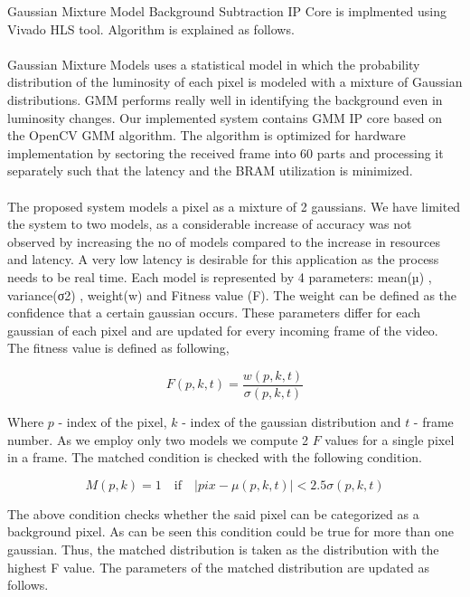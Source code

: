 \documentclass[12pt,a4paper]{report}
\begin{document}
Gaussian Mixture Model Background Subtraction IP Core is implmented using Vivado HLS tool. Algorithm is explained as follows.\\\\
Gaussian Mixture Models uses a statistical model in which the probability distribution of the luminosity of each pixel is modeled with a mixture of Gaussian distributions. GMM performs really well in identifying the background even in luminosity changes. Our implemented system contains GMM IP core based on the OpenCV GMM algorithm.  The algorithm is optimized for hardware implementation by sectoring the received frame into 60 parts and processing it separately such that the latency and the BRAM utilization is minimized.\\\\
The proposed system models a pixel as a mixture of 2 gaussians. We have limited the system to two models, as a considerable increase of accuracy was not observed by increasing the no of models compared to the increase in resources and latency. A very low latency is desirable for this application as the process needs to be real time. Each model is represented by 4 parameters: mean(µ) , variance(σ2) , weight(w) and Fitness value (F). The weight can be defined as the confidence that a certain gaussian occurs. These parameters differ for each gaussian of each pixel and are updated for every incoming frame of the video.\\
The fitness value is defined as following,

\begin{equation}
F(p,k,t)=\frac{w(p,k,t)}{\sigma(p,k,t)}
\end{equation}

Where $p$ - index of the pixel, $k$ - index of the gaussian distribution and $t$ - frame number. As we employ only two models we compute 2 $F$ values for a single pixel in a frame. The matched condition is checked with the following condition. 

\begin{equation}
M(p,k)=1 \quad \textrm{if}  \quad |pix- \mu(p,k,t)| < 2.5\sigma(p,k,t)
\end{equation}

The above condition checks whether the said pixel can be categorized as a background pixel. As can be seen this condition could be true for more than one gaussian. Thus, the matched distribution is taken as the distribution with the highest F value. The parameters of the matched distribution are updated as follows. 
\end{document}
